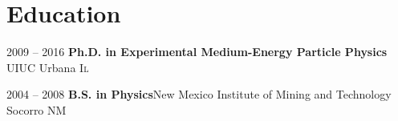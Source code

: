 \section{\textbf{Education}}

\cventry
{2009 -- 2016}
{\textbf{Ph.D. in Experimental Medium-Energy Particle Physics}}
{UIUC}
{Urbana}
{\textsc{Il}}{}


\cventry
{2004 -- 2008}
{\textbf{B.S. in Physics}}{New Mexico Institute of Mining and Technology}
{Socorro}
{\textsc{NM}}{}
